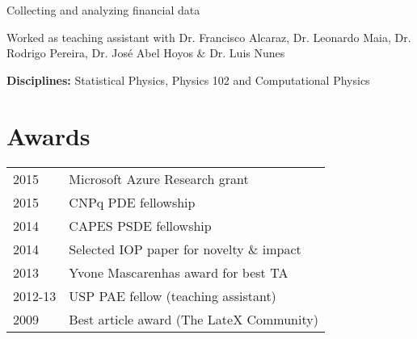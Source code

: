 \documentclass[letterpaper]{resume} %
\begin{document}
\begin{minipage}[t]{0.64\textwidth}
  \sectionspace %




  \begin{tightitemize}
  \item Collecting and analyzing financial data
  \end{tightitemize}

  \sectionspace %




  \begin{tightitemize}
  \item Worked as teaching assistant with Dr. Francisco Alcaraz, Dr. Leonardo Maia, Dr. Rodrigo Pereira, Dr. Jos\'e Abel Hoyos \& Dr. Luis Nunes
  \item {\bf Disciplines:} Statistical Physics, Physics 102 and Computational Physics
  \end{tightitemize}

  \sectionspace %



  \section{Awards}

  \begin{tabular}{ll}
  2015   & Microsoft Azure Research grant\\
  2015   & CNPq PDE fellowship\\
  2014   & CAPES PSDE fellowship\\
  2014   & Selected IOP paper for novelty \& impact\\
  2013   & Yvone Mascarenhas award for best TA \\
  2012-13 & USP PAE fellow (teaching assistant) \\
  2009   & Best article award (The LateX Community)
  \end{tabular}


\end{minipage}
\end{document}
